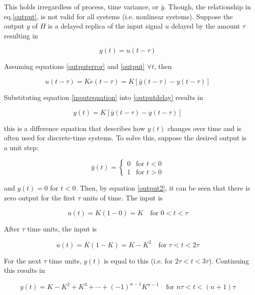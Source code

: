 \documentclass[10pt]{article}
\begin{document}
This holds irregardless of process, time variance, or $\bar y$. Though, the relationship in eq.\ref{output}, is not valid for all systems (i.e. nonlinear systems). Suppose the output $y$ of $H$ is a delayed replica of the input signal $u$ delayed by the amount $\tau$ resulting in

\begin{equation}
    \label{outputdelay}
    y(t) = u(t-\tau)
\end{equation}

Assuming equations \ref{outputerror} and \ref{output} $\forall t$, then

\begin{equation}
    \label{inputequation}
    u(t-\tau) = Ke(t-\tau) = K\left[ \bar y(t-\tau) - y(t-\tau) \right]
\end{equation}

Substituting equation \ref{inputequation} into \ref{outputdelay} results in

\begin{equation}
    y(t) = K \left[ \bar y(t-\tau) - y(t-\tau) \right]
    \label{output2}
\end{equation}

\noindent this is a difference equation that describes how $y(t)$ changes over time and is often used for discrete-time systems. To solve this, suppose the desired output is a unit step:

\begin{equation}
    \bar y(t) =
    \begin{cases}
        0 & \text{for } t < 0 \\
        1 & \text{for } t > 0
    \end{cases}
\end{equation}

\noindent and $y(t) = 0$ for $t < 0$. Then, by equation \ref{output2}, it can be seen that there is zero output for the first $\tau$ units of time. The input is

$$
u(t) = K(1-0) = K \quad \text{for } 0<t<\tau
$$

After $\tau$ time units, the input is

$$
u(t) = K(1-K) = K - K^2 \quad \text{for } \tau < t < 2\tau
$$

\noindent For the next $\tau$ time units, $y(t)$ is equal to this (i.e. for $2\tau < t < 3\tau$). Continuing this results in

\begin{equation}
    y(t) = K - K^2 + K^3 + \cdots + (-1)^{n-1}K^{n-1} \quad \text{for } n\tau < t < (n+1)\tau
    \label{outputn}
\end{equation}
\end{document}
